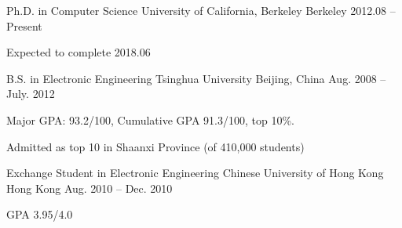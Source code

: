 

\begin{cventries}

  \cventry
  {Ph.D. in Computer Science}
  {University of California, Berkeley}
  {Berkeley}
  {2012.08 -- Present}
  {
    \begin{cvitems}
    \item {Expected to complete 2018.06}
    \end{cvitems}
  }

  \cventry
  {B.S. in Electronic Engineering}
  {Tsinghua University}
  {Beijing, China}
  {Aug. 2008 -- July. 2012}
  {
    \begin{cvitems} %
    \item{Major GPA: 93.2/100, Cumulative GPA 91.3/100, top 10\%.}
    \item{Admitted as top 10 in Shaanxi Province (of 410,000 students)}
    \end{cvitems}
  }

  \cventry
  {Exchange Student in Electronic Engineering}
  {Chinese University of Hong Kong}
  {Hong Kong}
  {Aug. 2010 -- Dec. 2010}
  {
    \begin{cvitems}
    \item {GPA 3.95/4.0}
    \end{cvitems}
  }

\end{cventries}

